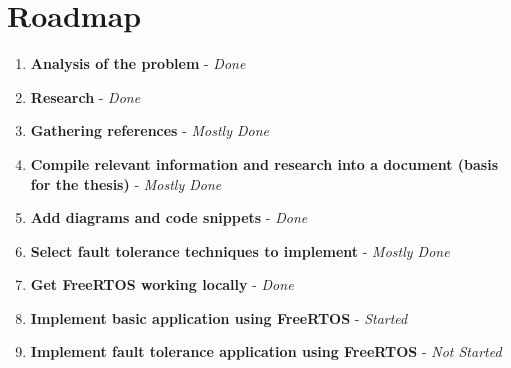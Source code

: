 \documentclass[12pt, letterpaper]{article}
\begin{document}
\section{Roadmap}

\begin{enumerate}[label=\arabic*.]
    \item \textbf{Analysis of the problem} - \textit{Done}
    \item \textbf{Research} - \textit{Done}
    \item \textbf{Gathering references} - \textit{Mostly Done}
    \item \textbf{Compile relevant information and research into a document (basis for the thesis)} - \textit{Mostly Done}
    \item \textbf{Add diagrams and code snippets} - \textit{Done}
    \item \textbf{Select fault tolerance techniques to implement} - \textit{Mostly Done}
    \item \textbf{Get FreeRTOS working locally} - \textit{Done}
    \item \textbf{Implement basic application using FreeRTOS} - \textit{Started}
    \item \textbf{Implement fault tolerance application using FreeRTOS} - \textit{Not Started}
\end{enumerate}

\newpage
\printbibliography
\end{document}
